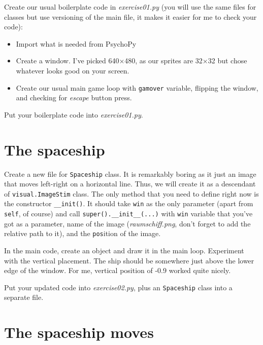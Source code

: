 \documentclass[
]{book}
\providecommand{\tightlist}{%
  \setlength{\itemsep}{0pt}\setlength{\parskip}{0pt}}
\begin{document}
Create our usual boilerplate code in \emph{exercise01.py} (you will use the same files for classes but use versioning of the main file, it makes it easier for me to check your code):

\begin{itemize}
\tightlist
\item
  Import what is needed from PsychoPy
\item
  Create a window. I've picked 640×480, as our sprites are 32×32 but chose whatever looks good on your screen.
\item
  Create our usual main game loop with \texttt{gamover} variable, flipping the window, and checking for \emph{escape} button press.
\end{itemize}

Put your boilerplate code into \emph{exercise01.py}.

\hypertarget{the-spaceship}{%
\section{The spaceship}\label{the-spaceship}}

Create a new file for \texttt{Spaceship} class. It is remarkably boring as it just an image that moves left-right on a horizontal line. Thus, we will create it as a descendant of \texttt{visual.ImageStim} class. The only method that you need to define right now is the constructor \texttt{\_\_init()}. It should take \texttt{win} as the only parameter (apart from \texttt{self}, of course) and call \texttt{super().\_\_init\_\_(...)} with \texttt{win} variable that you've got as a parameter, name of the image (\emph{raumschiff.png}, don't forget to add the relative path to it), and the \texttt{pos}ition of the image.

In the main code, create an object and draw it in the main loop. Experiment with the vertical placement. The ship should be somewhere just above the lower edge of the window. For me, vertical position of -0.9 worked quite nicely.

Put your updated code into \emph{exercise02.py}, plus an \texttt{Spaceship} class into a separate file.

\hypertarget{the-spaceship-moves}{%
\section{The spaceship moves}\label{the-spaceship-moves}}
\end{document}
